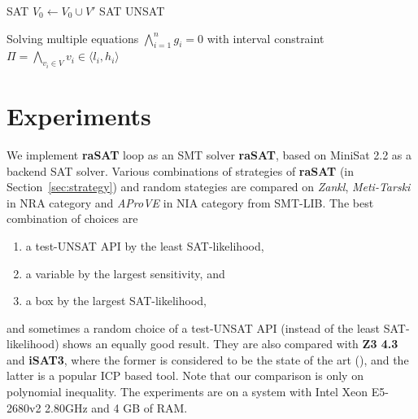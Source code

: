 \documentclass[runningheads,a4paper,oribibl]{llncs}
\begin{document}
\begin{algorithm}
\begin{algorithmic}[1]
 
	\State \Return SAT
\EndIf
{} 
		\State $V_0 \gets V_0 \cup V'$
			\State \Return SAT
		\EndIf
	\EndIf
\EndFor
\State \Return UNSAT
\EndFunction
\State {}
\end{algorithmic}
\caption{Solving multiple equations $\bigwedge\limits_{i=1}^n g_i = 0$ with interval constraint ${\Pi = \bigwedge\limits_{v_i \in V} v_i \in \langle l_i, h_i \rangle}$}
\label{Al:multiple-equations}
\end{algorithm}

\section{Experiments} \label{sec:experiment}

We implement \textbf{raSAT} loop as an SMT solver {\bf raSAT}, 
based on MiniSat 2.2 as a backend SAT solver. 
Various combinations of strategies of {\bf raSAT} (in Section~\ref{sec:strategy})
and random stategies are compared on {\em Zankl}, {\em Meti-Tarski} in NRA category 
and {\em AProVE} in NIA category from SMT-LIB. 
The best combination of choices are 
\begin{enumerate}
\item a test-UNSAT API by the least SAT-likelihood, 
\item a variable by the largest sensitivity, and 
\item a box by the largest SAT-likelihood, 
\end{enumerate} 
and sometimes a random choice of a test-UNSAT API (instead of the least SAT-likelihood) 
shows an equally good result. 
They are also compared with \textbf{Z3 4.3} and \textbf{iSAT3}, 
where the former is considered to be the state of the art (\cite{Jovanovic13}), and 
the latter is a popular ICP based tool. 
Note that our comparison is only on polynomial inequality. 
The experiments are on a system with Intel Xeon E5-2680v2 2.80GHz and 4 GB of RAM. 
\end{document}
